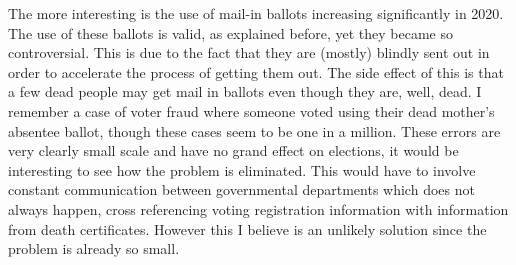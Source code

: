 \documentclass[12pt]{article}
\begin{document}
The more interesting is the use of mail-in ballots increasing significantly in 2020. The use of these ballots is valid, as explained before, yet they became so controversial. This is due to the fact that they are (mostly) blindly sent out in order to accelerate the process of getting them out. The side effect of this is that a few dead people may get mail in ballots even though they are, well, dead. I remember a case of voter fraud where someone voted using their dead mother's absentee ballot, though these cases seem to be one in a million. These errors are very clearly small scale and have no grand effect on elections, it would be interesting to see how the problem is eliminated. This would have to involve constant communication between governmental departments which does not always happen, cross referencing voting registration information with information from death certificates. However this I believe is an unlikely solution since the problem is already so small. 
\end{document}
